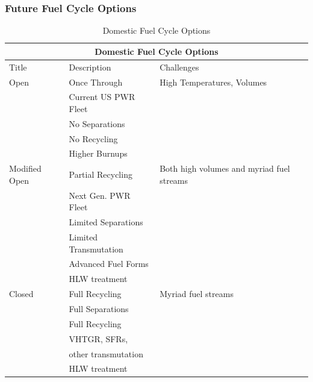 \begin{frame}[ctb!]
  \frametitle{Future Fuel Cycle Options}
    \begin{table}
      \centering
      \footnotesize{
      \begin{tabular}{|l|l|l|}
        \multicolumn{3}{c}{\textbf{Domestic Fuel Cycle Options}}\\
        \hline
        Title & Description& Challenges \\
        \hline
        \hline
        Open          & Once Through         & High Temperatures, Volumes \\
                      & Current US PWR Fleet &      \\
                      & No Separations       &      \\
                      & No Recycling         &      \\
                      & Higher Burnups &      \\
        \hline
        Modified Open & Partial Recycling    & Both high volumes and myriad fuel streams \\
                      & Next Gen. PWR Fleet &      \\
                      & Limited Separations  &      \\
                      & Limited Transmutation &      \\
                      & Advanced Fuel Forms  &      \\
                      & HLW treatment    &          \\
        \hline
        Closed        & Full Recycling       & Myriad fuel streams \\
                      & Full Separations &      \\
                      & Full Recycling &      \\
                      & VHTGR, SFRs, &      \\
                      & other transmutation & \\
                      & HLW treatment  &      \\
        \hline
      \end{tabular}
      \caption[Fuel Cycle Options]{Domestic Fuel Cycle Options }
      \label{tab:fco}
      }
    \end{table}
\end{frame}


